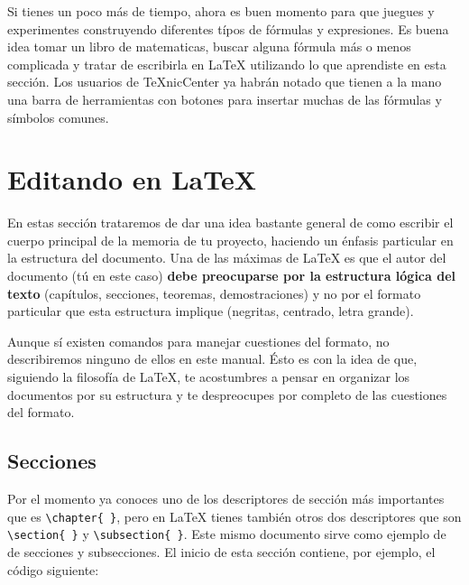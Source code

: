 Si tienes un poco m\'as de tiempo, ahora es buen momento para que juegues y experimentes
construyendo diferentes t\'ipos de f\'ormulas y expresiones. Es buena idea tomar un libro de
matematicas, buscar alguna f\'ormula m\'as o menos complicada y tratar de escribirla en
\LaTeX{} utilizando lo que aprendiste en esta secci\'on. Los usuarios de \TeX{}nicCenter ya habr\'an
notado que tienen a la mano una barra de herramientas con botones para insertar muchas de
las f\'ormulas y s\'imbolos comunes.



\section{Editando en \LaTeX{}}

En estas secci\'on trataremos de dar una idea bastante general de como escribir
el cuerpo principal de la memoria de tu proyecto, haciendo un \'enfasis particular en la
estructura del documento. Una de las m\'aximas de \LaTeX{} es que el autor del documento
(t\'u en este caso) \textbf{debe preocuparse por la estructura l\'ogica del texto}
(cap\'itulos, secciones, teoremas, demostraciones) y no por el formato particular
que esta estructura implique (negritas, centrado, letra grande).

Aunque s\'i existen comandos para manejar cuestiones del formato, no describiremos
ninguno de ellos en este manual. \'Esto es con la idea de que, siguiendo la filosof\'ia
de \LaTeX{}, te acostumbres a pensar en organizar los documentos por su estructura y te
despreocupes por completo de las cuestiones del formato.


\subsection{Secciones}\label{secciones}

Por el momento ya conoces uno de los descriptores de secci\'on m\'as importantes
que es \verb|\chapter{ }|, pero en \LaTeX{} tienes tambi\'en otros dos
descriptores que son \verb|\section{ }| y \verb|\subsection{ }|. Este mismo
documento sirve como ejemplo de de secciones y subsecciones. El inicio de esta
secci\'on contiene, por ejemplo, el c\'odigo siguiente:

